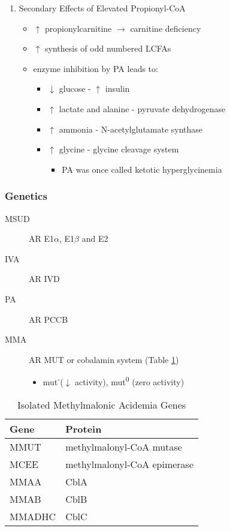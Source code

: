 \documentclass[12pt]{scrartcl}
\begin{document}
\begin{enumerate}
\item Secondary Effects of Elevated Propionyl-CoA
\label{sec:org64cb29e}
\begin{itemize}
\item \(\uparrow\) propionylcarnitine \(\to\) carnitine deficiency
\item \(\uparrow\) synthesis of odd numbered LCFAs
\item enzyme inhibition by PA leads to:
\begin{itemize}
\item \(\downarrow\) glucose - \(\uparrow\) insulin
\item \(\uparrow\) lactate and alanine - pyruvate dehydrogenase
\item \(\uparrow\) ammonia - N-acetylglutamate synthase
\item \(\uparrow\) glycine - glycine cleavage system
\begin{itemize}
\item PA was once called ketotic hyperglycinemia
\end{itemize}
\end{itemize}
\end{itemize}
\end{enumerate}

\subsubsection{Genetics}
\label{sec:orgb0d2aa3}
\begin{description}
\item[{MSUD}] AR E1\(\alpha\), E1\(\beta\) and E2
\item[{IVA}] AR IVD
\item[{PA}] AR PCCB
\item[{MMA}] AR MUT or cobalamin system (Table \ref{tab:orgbe34437})
\begin{itemize}
\item mut\textsuperscript{-}(\(\downarrow\) activity), mut\textsuperscript{0} (zero activity)
\end{itemize}
\end{description}

\begin{table}[htbp]
\caption{\label{tab:orgbe34437}Isolated Methylmalonic Acidemia Genes}
\centering
\begin{tabular}{ll}
Gene & Protein\\
\hline
MMUT & methylmalonyl-CoA mutase\\
MCEE & methylmalonyl-CoA epimerase\\
MMAA & CblA\\
MMAB & CblB\\
MMADHC\footnotemark & CblC\\
\end{tabular}
\end{table}
\end{document}
